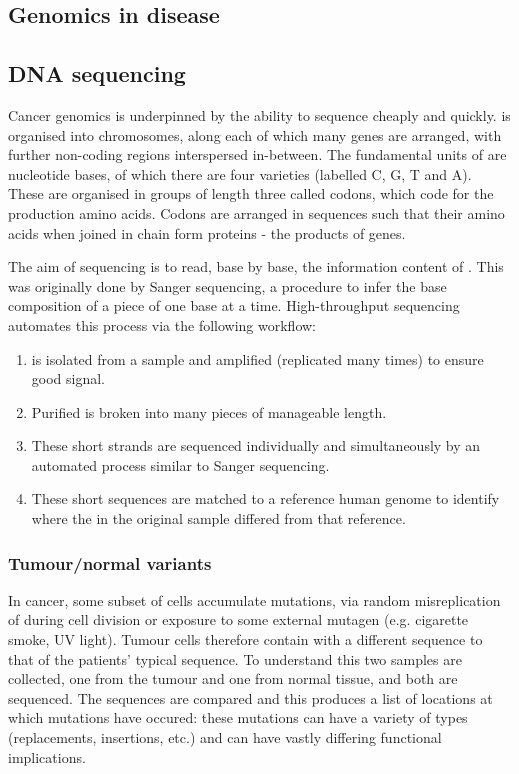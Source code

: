 \documentclass[thesis.tex]{subfiles}
\begin{document}
\subsection{Genomics in disease}

\subsection{DNA sequencing}
Cancer genomics is underpinned by the ability to sequence  cheaply and quickly.  is organised into chromosomes, along each of which many genes are arranged, with further non-coding regions interspersed in-between. The fundamental units of  are nucleotide bases, of which there are four varieties (labelled C, G, T and A). These are organised in groups of length three called codons, which code for the production amino acids. Codons are arranged in sequences such that their amino acids when joined in chain form proteins - the products of genes. 

The aim of sequencing is to read, base by base, the information content of . This was originally done by Sanger sequencing, a procedure to infer the base composition of a piece of  one base at a time. High-throughput sequencing automates this process via the following workflow:
\begin{enumerate}
    \item {} is isolated from a sample and amplified (replicated many times) to ensure good signal.
    \item Purified  is broken into many pieces of manageable length.
    \item These short strands are sequenced individually and simultaneously by an automated process similar to Sanger sequencing.
    \item These short sequences are matched to a reference human genome to identify where the  in the original sample differed from that reference.
\end{enumerate}

\subsubsection{Tumour/normal variants}
In cancer, some subset of cells accumulate mutations, via random misreplication of  during cell division or exposure to some external mutagen (e.g. cigarette smoke, UV light). Tumour cells therefore contain  with a different sequence to that of the patients' typical sequence. To understand this two samples are collected, one from the tumour and one from normal tissue, and both are sequenced. The sequences are compared and this produces a list of locations at which mutations have occured: these mutations can have a variety of types (replacements, insertions, etc.) and can have vastly differing functional implications.
\end{document}
